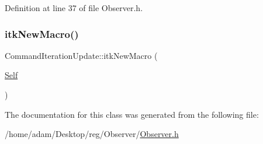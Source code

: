 Definition at line 37 of file Observer.\+h.

\mbox{\label{class_command_iteration_update_a45a63d6e43a42eabd6adb27b1309c7a1}} 
\subsubsection{\texorpdfstring{itk\+New\+Macro()}{itkNewMacro()}}
{\footnotesize\ttfamily Command\+Iteration\+Update\+::itk\+New\+Macro (\begin{DoxyParamCaption}\item[{\hyperlink{class_command_iteration_update_a82da0970ef8c14141f85f3465f08242e}{Self}}]{ }\end{DoxyParamCaption})}



The documentation for this class was generated from the following file\+:\begin{DoxyCompactItemize}
\item 
/home/adam/\+Desktop/reg/\+Observer/\hyperlink{_observer_8h}{Observer.\+h}\end{DoxyCompactItemize}
